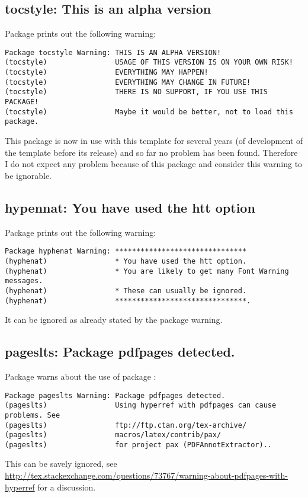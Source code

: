 \subsection{tocstyle: This is an alpha version}

Package  prints out the following warning:
%
\begin{verbatim}
Package tocstyle Warning: THIS IS AN ALPHA VERSION!
(tocstyle)                USAGE OF THIS VERSION IS ON YOUR OWN RISK!
(tocstyle)                EVERYTHING MAY HAPPEN!
(tocstyle)                EVERYTHING MAY CHANGE IN FUTURE!
(tocstyle)                THERE IS NO SUPPORT, IF YOU USE THIS PACKAGE!
(tocstyle)                Maybe it would be better, not to load this package.
\end{verbatim}
%
This package is now in use with this template for several years (of development of the template before its release) and so far no problem has been found. Therefore I do not expect any problem because of this package and consider this warning to be ignorable.

\subsection{hypennat: You have used the htt option}

Package  prints out the following warning:
%
\begin{verbatim}
Package hyphenat Warning: *******************************
(hyphenat)                * You have used the htt option.
(hyphenat)                * You are likely to get many Font Warning messages.
(hyphenat)                * These can usually be ignored.
(hyphenat)                *******************************.
\end{verbatim}
%
It can be ignored as already stated by the package warning.

\subsection{pageslts: Package pdfpages detected.}

Package  warns about the use of package :
%
\begin{verbatim}
Package pageslts Warning: Package pdfpages detected.
(pageslts)                Using hyperref with pdfpages can cause problems. See
(pageslts)                ftp://ftp.ctan.org/tex-archive/
(pageslts)                macros/latex/contrib/pax/
(pageslts)                for project pax (PDFAnnotExtractor)..
\end{verbatim}
%
This can be savely ignored, see \url{http://tex.stackexchange.com/questions/73767/warning-about-pdfpages-with-hyperref} for a discussion.


